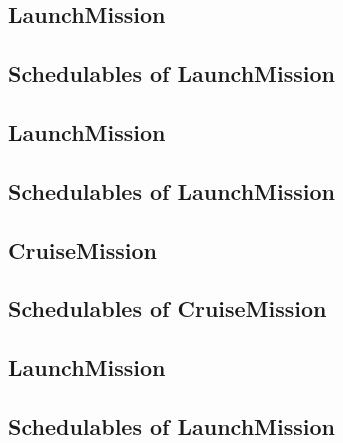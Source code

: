 \documentclass[10pt,a4paper]{article}
\begin{document}
\subsection{LaunchMission}

\newpage

\subsection{Schedulables of LaunchMission}


\newpage


\subsection{LaunchMission}

\newpage

\subsection{Schedulables of LaunchMission}


\newpage


\subsection{CruiseMission}

\newpage

\subsection{Schedulables of CruiseMission}


\newpage


\newpage


\newpage


\subsection{LaunchMission}

\newpage

\subsection{Schedulables of LaunchMission}


\newpage
\end{document}

